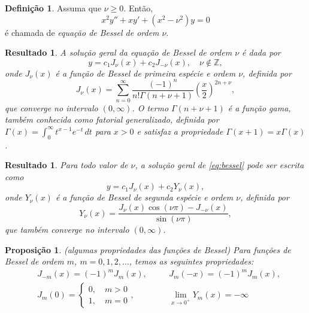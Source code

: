 \documentclass[12pt]{article}
\theoremstyle{plain}
\newtheorem{prop}[thm]{Proposição}
\newtheorem{res}[thm]{Resultado}
\theoremstyle{definition}
\newtheorem{defn}{Definição}[section]
\theoremstyle{remark}
\begin{document}
\begin{defn}
    Assuma que \(\nu\geq0\). Então,
    \begin{equation}\label{eq:bessel}
        x^2y'' + xy' + (x^2 - \nu^2)y = 0
    \end{equation}
    \noindent é chamada de \emph{equação de Bessel de ordem \(\nu\)}.
\end{defn}

\begin{res}
    A solução geral da equação de Bessel de ordem \(\nu\) é dada por
    \begin{equation}
        y = c_1 J_{\nu}(x) + c_2 J_{-\nu}(x), \quad \nu \notin \mathbb{Z},
    \end{equation}
    \noindent onde \(J_{\nu}(x)\) é a função de Bessel de primeira espécie e ordem \(\nu\), definida por
    \begin{equation}
        J_{\nu}(x) = \sum_{n=0}^{\infty} \frac{(-1)^n}{n! \Gamma(n+\nu+1)} \left(\frac{x}{2}\right)^{2n+\nu},
    \end{equation}
    \noindent que converge no intervalo \((0,\infty)\). O termo \(\Gamma(n+\nu+1)\) é a função gama, também conhecida como fatorial generalizado, definida por \(\Gamma(x) = \int_0^{\infty} t^{x-1} e^{-t} \, dt\) para \(x>0\) e satisfaz a propriedade \(\Gamma(x+1) = x\Gamma(x)\).
\end{res}

\begin{res}
    Para todo valor de \(\nu\), a solução geral de \eqref{eq:bessel} pode ser escrita como
    \begin{equation}
        y = c_1 J_{\nu}(x) + c_2 Y_{\nu}(x),
    \end{equation}
    \noindent onde \(Y_{\nu}(x)\) é a função de Bessel de segunda espécie e ordem \(\nu\), definida por
    \begin{equation}
        Y_{\nu}(x) = \frac{J_{\nu}(x) \cos(\nu \pi) - J_{-\nu}(x)}{\sin(\nu \pi)},
    \end{equation}
    \noindent que também converge no intervalo \((0,\infty)\).
\end{res}

\begin{prop} (algumas propriedades das funções de Bessel)
    Para funções de Bessel de ordem \(m\), \(m=0,1,2,\ldots\), temos as seguintes propriedades:
    \begin{align*}
        &J_{-m}(x) = (-1)^m J_m(x), \quad & &J_m(-x) = (-1)^m J_m(x), \\
        &J_m(0) = \begin{cases}
            0, \quad m > 0 \\
            1, \quad m = 0
        \end{cases}, \quad & &\lim_{x\to 0^{+}} Y_m(x) = -\infty
    \end{align*}
\end{prop}
\end{document}
